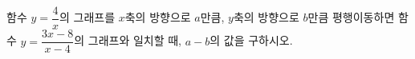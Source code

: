 함수 $y=\dfrac{4}{x}$의 그래프를 $x$축의 방향으로 $a$만큼, $y$축의 방향으로 $b$만큼 평행이동하면 함수 $y=\dfrac{3x-8}{x-4}$의 그래프와 일치할 때, $a-b$의 값을 구하시오.
